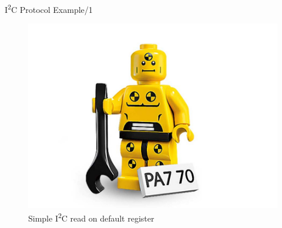 \documentclass[]{beamer} %
\newcommand{\twi}{I\textsuperscript{2}C\xspace}
\newenvironment{changemargin}[2]
{
	\begin{list}{}
		{
			\setlength{\topsep}{0pt}
			\setlength{\leftmargin}{#1}
			\setlength{\rightmargin}{#2}
			\setlength{\listparindent}{\parindent}
		\setlength{\itemindent}{\parindent}
			\setlength{\parsep}{\parskip}
		}
	\item[]
	}
	{
	\end{list}
}
\begin{document}
\begin{frame}[fragile]{\twi Protocol Example/1}
			\begin{figure}
				\includegraphics[width=\textwidth,height=0.8\textheight,keepaspectratio]{dummy}
				\caption{Simple \twi read on default register}
			\end{figure}
\end{frame}
\end{document}
